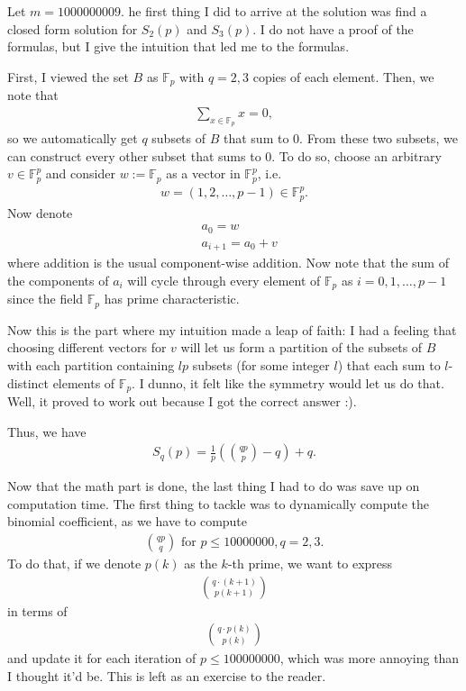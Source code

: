 \documentclass[12pt]{article}
\begin{document}
 
\noindent
Let $m = 1000000009$. he first thing I did to arrive at the solution was find a closed form solution for $S_2(p)$ and $S_3(p)$. I do not have a proof of the formulas, but I give the intuition that led me to the formulas.

First, I viewed the set $B$ as $\mathbb{F}_p$ with $q = 2, 3$ copies of each element. Then, we note that
\begin{align*}
    \sum_{x \in \mathbb{F}_p} x = 0,
\end{align*}
so we automatically get $q$ subsets of $B$ that sum to 0. From these two subsets, we can construct every other subset that sums to 0. To do so, choose an arbitrary $v \in \mathbb{F}_p^p$ and consider $w := \mathbb{F}_p$ as a vector in $\mathbb{F}_p^p$, i.e.
\begin{align*}
    w = (1, 2, \dots, p-1) \in \mathbb{F}_p^p.
\end{align*}
Now denote
\begin{align*}
    &a_0 = w\\
    &a_{i+1} = a_0 + v
\end{align*}
where addition is the usual component-wise addition. Now note that the sum of the components of $a_i$ will cycle through every element of $\mathbb{F}_p$ as $i = 0, 1, \dots, p - 1$ since the field $\mathbb{F}_p$ has prime characteristic. 

Now this is the part where my intuition made a leap of faith: I had a feeling that choosing different vectors for $v$ will let us form a partition of the subsets of $B$ with each partition containing $lp$ subsets (for some integer $l$) that each sum to $l$-distinct elements of $\mathbb{F}_p$. I dunno, it felt like the symmetry would let us do that. Well, it proved to work out because I got the correct answer :).

Thus, we have
\begin{align*}
    S_q(p) = \frac{1}{p} \left(\binom{qp}{p} - q\right) + q.
\end{align*}

Now that the math part is done, the last thing I had to do was save up on computation time. The first thing to tackle was to dynamically compute the binomial coefficient, as we have to compute 
\begin{align*}
    \binom{qp}{q} \text{ for } p \leq 10000000, q = 2, 3.
\end{align*}
To do that, if we denote $p(k)$ as the $k$-th prime, we want to express
\begin{align*}
    \binom{q\cdotp(k+1)}{p(k+1)}
\end{align*}
in terms of
\begin{align*}
    \binom{q\cdot p(k)}{p(k)}
\end{align*}
and update it for each iteration of $p \leq 100000000$, which was more annoying than I thought it'd be. This is left as an exercise to the reader.
\end{document}
